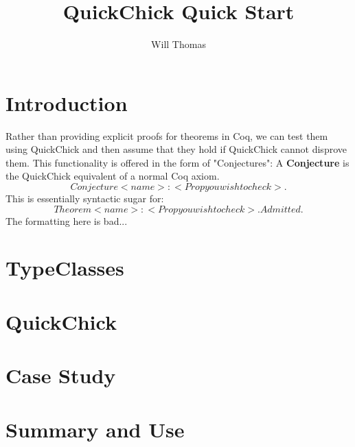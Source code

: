 \documentclass{article}
\title{\textbf{QuickChick Quick Start}}
\author{Will Thomas}
\begin{document}
    \maketitle

    \section{Introduction}
    Rather than providing explicit proofs for theorems in Coq, we can test them using QuickChick and then assume that they hold if QuickChick cannot disprove them. This functionality is offered in the form of "Conjectures": 
    A \textbf{Conjecture} is the QuickChick equivalent of a normal Coq axiom.
    $$ Conjecture <name> : <Prop you wish to check>.$$ 
    This is essentially syntactic sugar for:
    $$ Theorem <name> : <Prop you wish to check>. Admitted.$$
    The formatting here is bad...

    \section{TypeClasses}

    \section{QuickChick}

    \section{Case Study}

    \section{Summary and Use}
\end{document}
